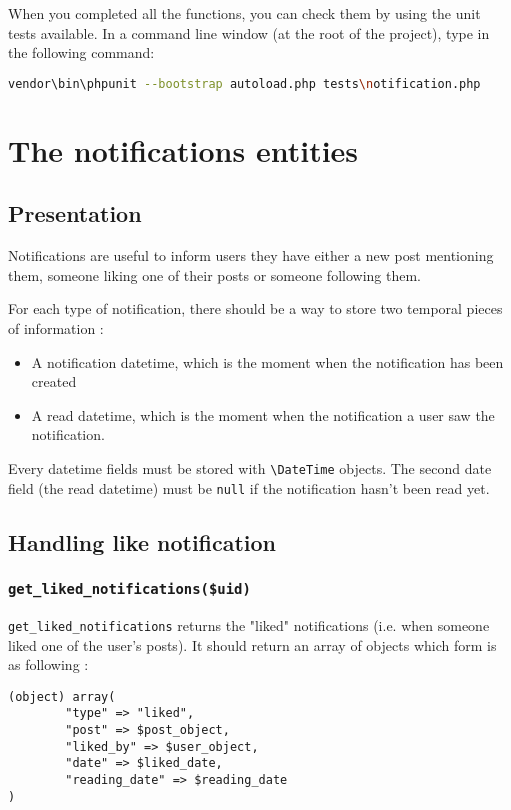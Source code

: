 \documentclass[twoside,a4paper,12pt]{article}
\begin{document}
When you completed all the functions, you can check them by using the unit tests available. In a command line window (at the root of the project), type in the following command:

\begin{lstlisting}[language=bash]
vendor\bin\phpunit --bootstrap autoload.php tests\notification.php
\end{lstlisting}

\section{The notifications entities}

\subsection{Presentation}

Notifications are useful to inform users they have either a new post mentioning them, someone liking one of their posts or someone following them.

For each type of notification, there should be  a way to store two temporal pieces of information :

\begin{itemize}
\item A notification datetime, which is the moment when the notification has been created
\item A read datetime, which is the moment when the notification a user saw the notification.
\end{itemize}

Every datetime fields must be stored with \texttt{\textbackslash DateTime} objects. The second date field (the read datetime) must be \texttt{null} if the notification hasn't been read yet.

\subsection{Handling like notification}

\subsubsection{\texttt{get\_liked\_notifications(\$uid)}}
\texttt{get\_liked\_notifications} returns the "liked" notifications (i.e. when someone liked one of the user's posts). It should return an array of objects which form is as following :

\begin{lstlisting}
(object) array(
        "type" => "liked",
        "post" => $post_object,
        "liked_by" => $user_object,
        "date" => $liked_date,
        "reading_date" => $reading_date
)
\end{lstlisting}
\end{document}
